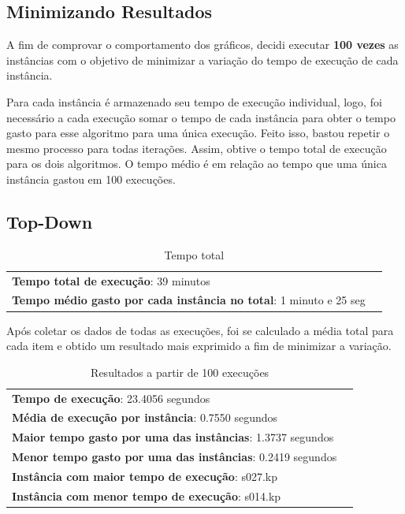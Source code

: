 \documentclass[a4paper, 12pt]{article}
\begin{document}
\subsection{Minimizando Resultados}
A fim de comprovar o comportamento dos gráficos, decidi executar {\bf 100 vezes} as instâncias com o objetivo de minimizar
a variação do tempo de execução de cada instância.

Para cada instância é armazenado seu tempo de execução individual, logo, foi necessário a cada execução somar o tempo
de cada instância para obter o tempo gasto para esse algoritmo para uma única execução. Feito isso, bastou
repetir o mesmo processo para todas iterações. Assim, obtive o tempo total de execução para os dois algoritmos. O tempo
médio é em relação ao tempo que uma única instância gastou em 100 execuções.
\subsection{Top-Down}
\begin{table}[!htb]
    \begin{tabular}{ll}
        {\bf Tempo total de execução}: 39 minutos\\
        {\bf Tempo médio gasto por cada instância no total}: 1 minuto e 25 seg
    \end{tabular}
    \caption{Tempo total}
    \label{tab:total_topdown}
\end{table}

Após coletar os dados de todas as execuções, foi se calculado a média total para cada item e obtido um resultado 
mais exprimido a fim de minimizar a variação.
\begin{table}[!htb]
    \begin{tabular}{ll}
        {\bf Tempo de execução}: 23.4056 segundos\\
        {\bf Média de execução por instância}: 0.7550 segundos\\
        {\bf Maior tempo gasto por uma das instâncias}: 1.3737 segundos\\
        {\bf Menor tempo gasto por uma das instâncias}: 0.2419 segundos \\
        {\bf Instância com maior tempo de execução}: s027.kp\\
        {\bf Instância com menor tempo de execução}: s014.kp
    \end{tabular}
    \caption{Resultados a partir de 100 execuções}
    \label{tab:result_tot_topdown}
\end{table}
\end{document}
